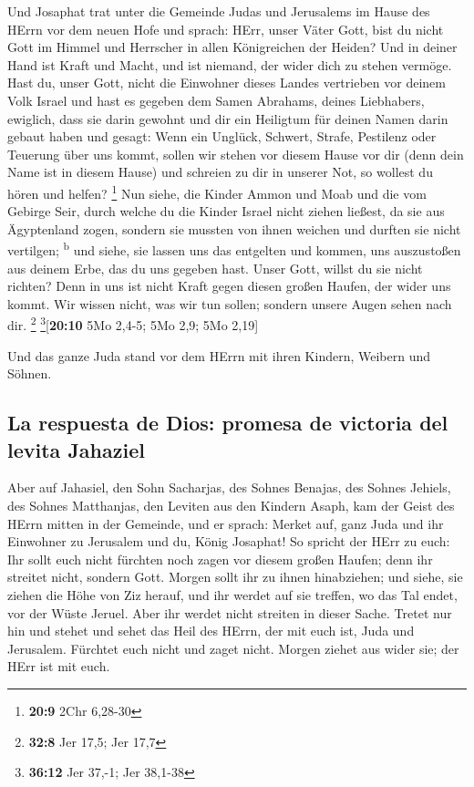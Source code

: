  Und Josaphat trat unter die Gemeinde Judas und Jerusalems
im Hause des HErrn vor dem neuen Hofe  und sprach: HErr,
unser Väter Gott, bist du nicht Gott im Himmel und Herrscher in allen
Königreichen der Heiden? Und in deiner Hand ist Kraft und Macht, und ist
niemand, der wider dich zu stehen vermöge.  Hast du, unser
Gott, nicht die Einwohner dieses Landes vertrieben vor deinem Volk
Israel und hast es gegeben dem Samen Abrahams, deines Liebhabers,
ewiglich,  dass sie darin gewohnt und dir ein Heiligtum
für deinen Namen darin gebaut haben und gesagt:  Wenn ein
Unglück, Schwert, Strafe, Pestilenz oder Teuerung über uns kommt, sollen
wir stehen vor diesem Hause vor dir (denn dein Name ist in diesem Hause)
und schreien zu dir in unserer Not, so wollest du hören und helfen?
\footnote{\textbf{20:9} 2Chr 6,28-30}  Nun siehe, die
Kinder Ammon und Moab und die vom Gebirge Seir, durch welche du die
Kinder Israel nicht ziehen ließest, da sie aus Ägyptenland zogen,
sondern sie mussten von ihnen weichen und durften sie nicht vertilgen;
\textsuperscript{b}  und siehe, sie lassen uns das
entgelten und kommen, uns auszustoßen aus deinem Erbe, das du uns
gegeben hast.  Unser Gott, willst du sie nicht richten?
Denn in uns ist nicht Kraft gegen diesen großen Haufen, der wider uns
kommt. Wir wissen nicht, was wir tun sollen; sondern unsere Augen sehen
nach dir. \footnote{\textbf{32:8} Jer 17,5; Jer 17,7}
\footnote{\textbf{36:12} Jer 37,-1; Jer 38,1-38}{[}\textbf{20:10} 5Mo
2,4-5; 5Mo 2,9; 5Mo 2,19{]}

 Und das ganze Juda stand vor dem HErrn mit ihren
Kindern, Weibern und Söhnen.

\hypertarget{la-respuesta-de-dios-promesa-de-victoria-del-levita-jahaziel}{%
\subsection{La respuesta de Dios: promesa de victoria del levita
Jahaziel}\label{la-respuesta-de-dios-promesa-de-victoria-del-levita-jahaziel}}

 Aber auf Jahasiel, den Sohn Sacharjas, des Sohnes
Benajas, des Sohnes Jehiels, des Sohnes Matthanjas, den Leviten aus den
Kindern Asaph, kam der Geist des HErrn mitten in der Gemeinde,
 und er sprach: Merket auf, ganz Juda und ihr Einwohner
zu Jerusalem und du, König Josaphat! So spricht der HErr zu euch: Ihr
sollt euch nicht fürchten noch zagen vor diesem großen Haufen; denn ihr
streitet nicht, sondern Gott.  Morgen sollt ihr zu ihnen
hinabziehen; und siehe, sie ziehen die Höhe von Ziz herauf, und ihr
werdet auf sie treffen, wo das Tal endet, vor der Wüste Jeruel.
 Aber ihr werdet nicht streiten in dieser Sache. Tretet
nur hin und stehet und sehet das Heil des HErrn, der mit euch ist, Juda
und Jerusalem. Fürchtet euch nicht und zaget nicht. Morgen ziehet aus
wider sie; der HErr ist mit euch.


